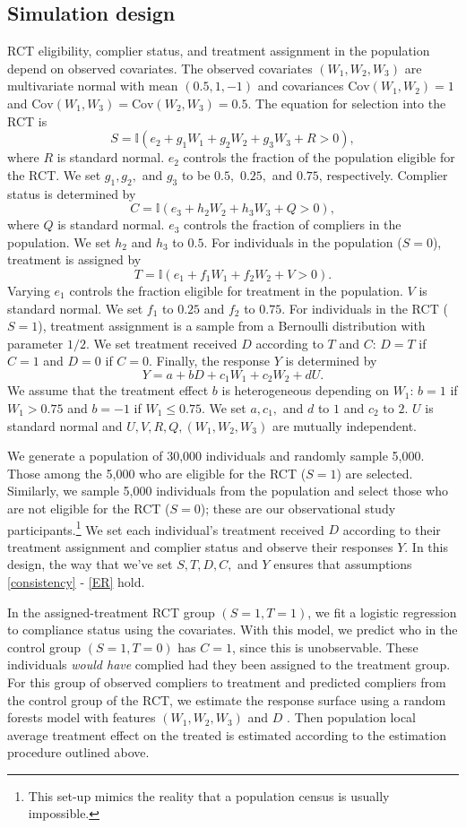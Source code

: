 \documentclass[12pt]{article}
\newcommand{\ind}{\mathbb{I}} %
\newcommand{\cov}{\mathrm{Cov}}
\begin{document}
\subsection{Simulation design}
RCT eligibility, complier status, and treatment assignment in the population depend on observed covariates. 
The observed covariates $(W_1, W_2, W_3)$ are multivariate normal with mean $(0.5, 1, -1)$ and covariances $\cov(W_1, W_2) = 1$ and $\cov(W_1, W_3) = \cov(W_2, W_3) = 0.5$. 
 The  equation for selection into the RCT is
 $$ S = \ind(e_2 + g_1W_1 + g_2W_2 + g_3W_3 + R > 0),$$
  where $R$ is standard normal. $e_2$ controls the fraction of the population eligible for the RCT. We set $g_1, g_2,$ and $g_3$ to be $0.5,$ $0.25,$ and $0.75$, respectively.
Complier status is determined by
$$C = \ind(e_3 + h_2W_2 + h_3W_3 + Q > 0),$$
where $Q$ is standard normal. $e_3$ controls the fraction of compliers in the population. We set $h_2$ and $h_3$ to $0.5$.
 For individuals in the population ($S=0$),  treatment is assigned by
  $$T = \ind(e_1 + f_1W_1 + f_2W_2 + V > 0).$$
Varying $e_1$ controls the fraction eligible for treatment in the population. $V$ is standard normal. We set $f_1$ to $0.25$ and $f_2$ to $0.75$.  For individuals in the RCT ($S=1$), treatment assignment is a sample from a Bernoulli distribution with parameter $1/2$.
We set treatment received $D$ according to $T$ and $C$: $D = T$ if $C=1$ and $D = 0$ if $C=0$.
Finally, the response $Y$ is determined by 
$$Y = a + bD + c_1W_1 + c_2W_2 + dU.$$
 We assume that the treatment effect $b$ is heterogeneous depending on $W_1$: $b = 1$ if $W_1 > 0.75$ and $b=-1$ if $W_1 \leq 0.75$.   We set $a, c_1,$ and $d$ to $1$ and $c_2$ to $2$. $U$ is standard normal and $U, V, R, Q, (W_1, W_2, W_3)$ are mutually independent.
 
We generate a population of 30,000 individuals and randomly sample 5,000.  Those among the 5,000 who are eligible for the RCT ($S=1$) are selected. Similarly, we sample 5,000 individuals from the population and select those who are not eligible for the RCT ($S=0$); these are our observational study participants.\footnote{This set-up mimics the reality that a population census is usually impossible.} We set each individual's treatment received $D$ according to their treatment assignment and complier status and observe their responses $Y$.  In this design, the way that we've set $S, T, D, C,$ and $Y$ ensures that assumptions \eqref{consistency} - \eqref{ER} hold.
 
In the assigned-treatment RCT group $(S = 1, T = 1)$, we fit a logistic regression to compliance status using the covariates.  With this model, we predict who in the control group $(S = 1, T = 0)$ has $C=1$, since this is unobservable.  These individuals \textit{would have} complied had they been assigned to the treatment group.  For this group of observed compliers to treatment and predicted compliers from the control group of the RCT, we estimate the response surface using a random forests model with features $(W_1, W_2, W_3)$ and $D$ \citep{breiman2001}.  Then population local average treatment effect on the treated is estimated according to the estimation procedure outlined above.
\end{document}
